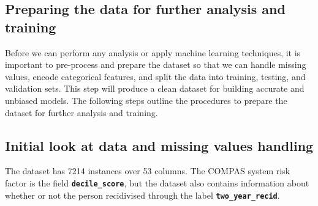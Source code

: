 




\subsection{Preparing the data for further analysis and training}

Before we can perform any analysis or apply machine learning techniques, it is important to pre-process and prepare the dataset so that we can handle missing values, encode categorical features, and split the data into training, testing, and validation sets. This step will produce a clean dataset for building accurate and unbiased models. The following steps outline the procedures to prepare the dataset for further analysis and training.


\subsection{Initial look at data and missing values handling}

The dataset has 7214 instances over 53 columns. The COMPAS system risk factor is the field  \textbf{\texttt{decile\_score}}, but the dataset also contains information about whether or not the person recidivised through the label \textbf{\texttt{two\_year\_recid}}. 

